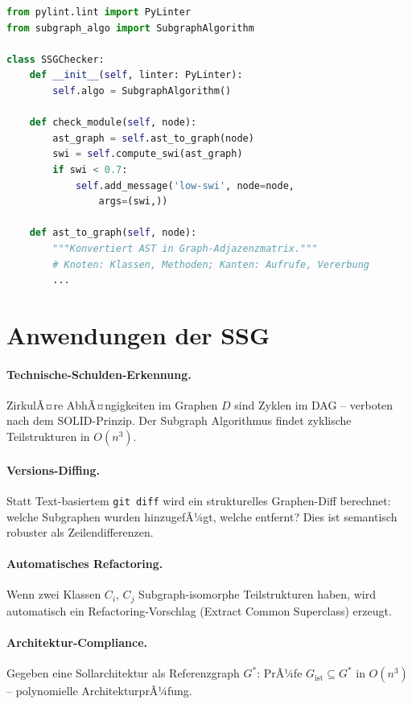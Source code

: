 ﻿\documentclass[a4paper,12pt]{scrreprt}
\theoremstyle{definition}
\begin{document}
\begin{lstlisting}[language=Python,caption={SSG als Pylint-Plugin}]
from pylint.lint import PyLinter
from subgraph_algo import SubgraphAlgorithm

class SSGChecker:
    def __init__(self, linter: PyLinter):
        self.algo = SubgraphAlgorithm()

    def check_module(self, node):
        ast_graph = self.ast_to_graph(node)
        swi = self.compute_swi(ast_graph)
        if swi < 0.7:
            self.add_message('low-swi', node=node,
                args=(swi,))

    def ast_to_graph(self, node):
        """Konvertiert AST in Graph-Adjazenzmatrix."""
        # Knoten: Klassen, Methoden; Kanten: Aufrufe, Vererbung
        ...
\end{lstlisting}

\section{Anwendungen der SSG}

\paragraph{Technische-Schulden-Erkennung.} ZirkulÃ¤re AbhÃ¤ngigkeiten im
Graphen $D$ sind Zyklen im DAG -- verboten nach dem SOLID-Prinzip.
Der Subgraph Algorithmus findet zyklische Teilstrukturen in $O(n^3)$.

\paragraph{Versions-Diffing.} Statt Text-basiertem \texttt{git diff} wird
ein strukturelles Graphen-Diff berechnet: welche Subgraphen wurden
hinzugefÃ¼gt, welche entfernt? Dies ist semantisch robuster als
Zeilendifferenzen.

\paragraph{Automatisches Refactoring.} Wenn zwei Klassen $C_i$, $C_j$
Subgraph-isomorphe Teilstrukturen haben, wird automatisch ein
Refactoring-Vorschlag (Extract Common Superclass) erzeugt.

\paragraph{Architektur-Compliance.} Gegeben eine Sollarchitektur als
Referenzgraph $G^*$: PrÃ¼fe $G_{\mathrm{ist}} \subseteq G^*$ in $O(n^3)$
-- polynomielle ArchitekturprÃ¼fung.
\end{document}
